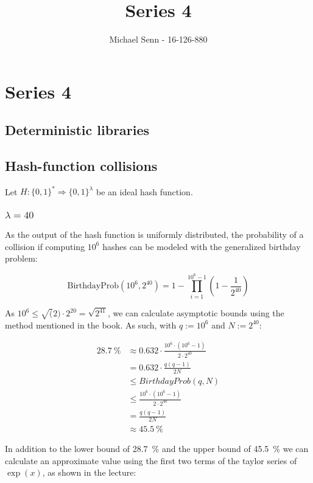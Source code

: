 \documentclass[a4paper]{scrreprt}
\title{Series 4}
\author{Michael Senn \maillink{michael.senn@students.unibe.ch} - 16-126-880}
\date{\printdate}
\begin{document}
\maketitle


\setcounter{chapter}{3}
\chapter{Series 4}

\section{Deterministic libraries}

\section{Hash-function collisions}

Let $H: \{0, 1\}^{*} \Rightarrow \{0, 1\}^\lambda$ be an ideal hash function.

\subsection{$\lambda = 40$}

As the output of the hash function is uniformly distributed, the probability of
a collision if computing $10^6$ hashes can be modeled with the generalized
birthday problem:

\[
	\text{BirthdayProb}(10^6, 2^{40}) = 1 - \prod_{i = 1}^{10^6 - 1} \left(1 - \frac{1}{2^{40}}\right)
\]

As $10^6 \leq \sqrt(2) \cdot 2^{20} = \sqrt{2^{41}}$, we can calculate
asymptotic bounds using the method mentioned in the book. As such, with $q :=
10^6$ and $N := 2^{40}$:

\begin{align*}
	\SI{28.7}{\percent} & \approx 0.632 \cdot \frac{10^6 \cdot (10^6 - 1)}{2 \cdot 2^{40}} \\
			    & = 0.632 \cdot \frac{q (q-1)}{2N}  \\
			    & \leq BirthdayProb(q, N) \\ 
			    & \leq \frac{10^6 \cdot (10^6 - 1)}{2 \cdot 2^{40}} \\
			    & = \frac{q (q-1)}{2N}  \\
			    & \approx \SI{45.5}{\percent}
\end{align*}

In addition to the lower bound of \SI{28.7}{\percent} and the upper bound of
\SI{45.5}{\percent} we can calculate an approximate value using the first two
terms of the taylor series of $\exp(x)$, as shown in the lecture:
\end{document}
